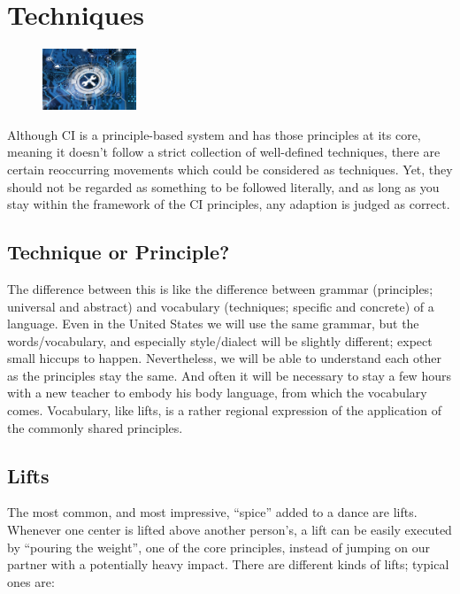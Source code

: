 \chapter{Techniques}\label{ch:techniques}

\begin{figure}
    \centering
    \includegraphics[width=0.25\textwidth]{images/techniques}
\end{figure}

Although CI is a principle-based system and has those principles at its core, meaning it doesn't follow a strict collection of well-defined techniques, there are certain reoccurring movements which could be considered as techniques.
Yet, they should not be regarded as something to be followed literally, and as long as you stay within the framework of the CI principles, any adaption is judged as correct.

\section{Technique or Principle?}\label{sec:technique-or-principle?}

The difference between this is like the difference between grammar (principles; universal and abstract) and vocabulary (techniques; specific and concrete) of a language.
Even in the United States we will use the same grammar, but the words/vocabulary, and especially style/dialect will be slightly different; expect small hiccups to happen.
Nevertheless, we will be able to understand each other as the principles stay the same.
And often it will be necessary to stay a few hours with a new teacher to embody his body language, from which the vocabulary comes.
Vocabulary, like lifts, is a rather regional expression of the application of the commonly shared principles.

\section{Lifts}\label{sec:lifts}

The most common, and most impressive, ``spice'' added to a dance are lifts.
Whenever one center is lifted above another person's, a lift can be easily executed by ``pouring the weight'', one of the core principles, instead of jumping on our partner with a potentially heavy impact.
There are different kinds of lifts; typical ones are:

